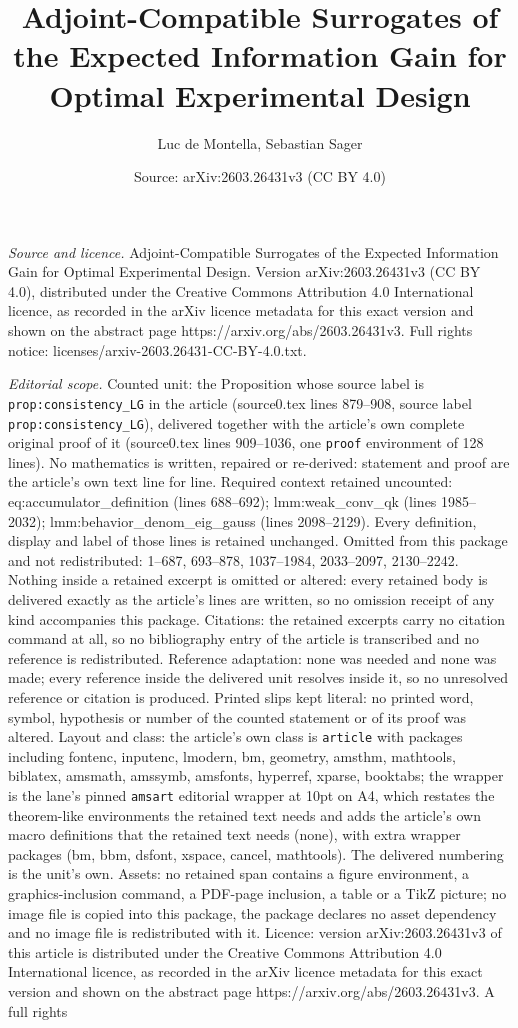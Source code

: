 \documentclass[10pt,a4paper]{amsart}
\title[Adjoint-Compatible Surrogates of the Expected Information Ga]{Adjoint-Compatible Surrogates of the Expected Information Gain for Optimal Experimental Design}
\author{Luc de Montella, Sebastian Sager}
\date{Source: arXiv:2603.26431v3 (CC BY 4.0)}
\begin{document}
\maketitle

\noindent\emph{Source and licence.} Adjoint-Compatible Surrogates of the Expected Information Gain for Optimal Experimental Design. Version arXiv:2603.26431v3 (CC BY 4.0), distributed under the Creative Commons Attribution 4.0 International licence, as recorded in the arXiv licence metadata for this exact version and shown on the abstract page https://arxiv.org/abs/2603.26431v3. Full rights notice: licenses/arxiv-2603.26431-CC-BY-4.0.txt.\par\smallskip

\noindent\textit{Editorial scope.} Counted unit: the Proposition whose source label is \texttt{prop:consistency\_LG} in the article (source0.tex lines 879--908, source label \texttt{prop:consistency\_LG}), delivered together with the article's own complete original proof of it (source0.tex lines 909--1036, one \texttt{proof} environment of 128 lines). No mathematics is written, repaired or re-derived: statement and proof are the article's own text line for line. Required context retained uncounted: eq:accumulator\_definition (lines 688--692); lmm:weak\_conv\_qk (lines 1985--2032); lmm:behavior\_denom\_eig\_gauss (lines 2098--2129). Every definition, display and label of those lines is retained unchanged. Omitted from this package and not redistributed: 1--687, 693--878, 1037--1984, 2033--2097, 2130--2242. Nothing inside a retained excerpt is omitted or altered: every retained body is delivered exactly as the article's lines are written, so no omission receipt of any kind accompanies this package. Citations: the retained excerpts carry no citation command at all, so no bibliography entry of the article is transcribed and no reference is redistributed. Reference adaptation: none was needed and none was made; every reference inside the delivered unit resolves inside it, so no unresolved reference or citation is produced. Printed slips kept literal: no printed word, symbol, hypothesis or number of the counted statement or of its proof was altered. Layout and class: the article's own class is \texttt{article} with packages including fontenc, inputenc, lmodern, bm, geometry, amsthm, mathtools, biblatex, amsmath, amssymb, amsfonts, hyperref, xparse, booktabs; the wrapper is the lane's pinned \texttt{amsart} editorial wrapper at 10pt on A4, which restates the theorem-like environments the retained text needs and adds the article's own macro definitions that the retained text needs (none), with extra wrapper packages (bm, bbm, dsfont, xspace, cancel, mathtools). The delivered numbering is the unit's own. Assets: no retained span contains a figure environment, a graphics-inclusion command, a PDF-page inclusion, a table or a TikZ picture; no image file is copied into this package, the package declares no asset dependency and no image file is redistributed with it. Licence: version arXiv:2603.26431v3 of this article is distributed under the Creative Commons Attribution 4.0 International licence, as recorded in the arXiv licence metadata for this exact version and shown on the abstract page https://arxiv.org/abs/2603.26431v3. A full rights 
\end{document}
